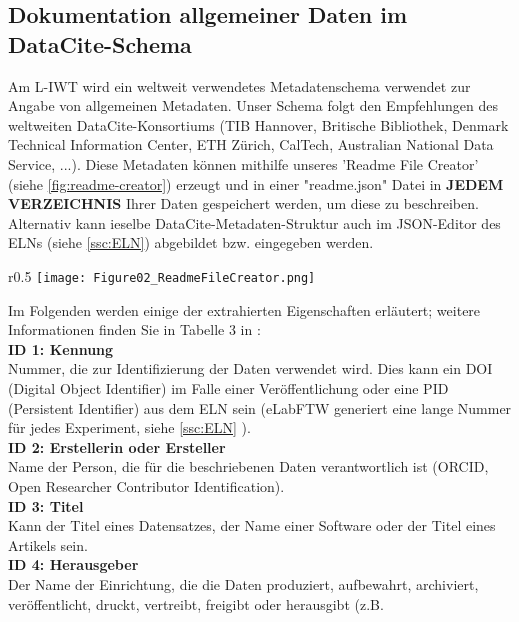 \subsection{Dokumentation allgemeiner Daten im DataCite-Schema}\label{sc:data-documentation}

Am L-IWT wird ein weltweit verwendetes Metadatenschema verwendet zur Angabe von allgemeinen Metadaten. Unser Schema folgt den Empfehlungen des weltweiten DataCite-Konsor\-tiums (TIB Hannover, Britische Bibliothek, Denmark Technical Information Center, ETH Zürich, CalTech, Australian National Data Service, ...). Diese Metadaten können mithilfe unseres 'Readme File Creator' (siehe \ref{fig:readme-creator}) erzeugt und in einer "readme.json" Datei in \textbf{JEDEM VERZEICHNIS} Ihrer Daten gespeichert werden, um diese zu beschreiben. Alternativ
kann ieselbe DataCite-Metadaten-Struktur auch im JSON-Editor des ELNs (siehe \ref{ssc:ELN}) abgebildet bzw. eingegeben werden. \\
\begin{wrapfigure}{r}{0.5\linewidth}
  \vspace{-1em}
  \texttt{[image: Figure02\_ReadmeFileCreator.png]}
  \caption{Data Input Tool: Readme-File-Creator}
  \label{fig:readme-creator}
\end{wrapfigure}
Im Folgenden werden einige der extrahierten Eigenschaften erläutert; weitere
Informationen finden Sie in Tabelle 3 in \cite{datacite2019}: \\[6pt]
%
\textbf{ID 1: Kennung} \\
Nummer, die zur Identifizierung der Daten verwendet wird. Dies kann ein DOI
(Digital Object Identifier) im Falle einer Veröffentlichung oder eine PID
(Persistent Identifier) aus dem ELN sein (eLabFTW  generiert eine lange Nummer
für jedes Experiment, siehe \ref{ssc:ELN} ). \\[6pt]
%
\textbf{ID 2: Erstellerin oder Ersteller} \\
Name der Person, die für die beschriebenen Daten verantwortlich ist (ORCID, Open Researcher Contributor Identification). \\[6pt]
%
\textbf{ID 3: Titel} \\
Kann der Titel eines Datensatzes, der Name einer Software oder der Titel eines
Artikels sein. \\[6pt]
%
\textbf{ID 4: Herausgeber} \\
Der Name der Einrichtung, die die Daten produziert, aufbewahrt, archiviert,
veröffentlicht, druckt, vertreibt, freigibt oder herausgibt (z.B.
